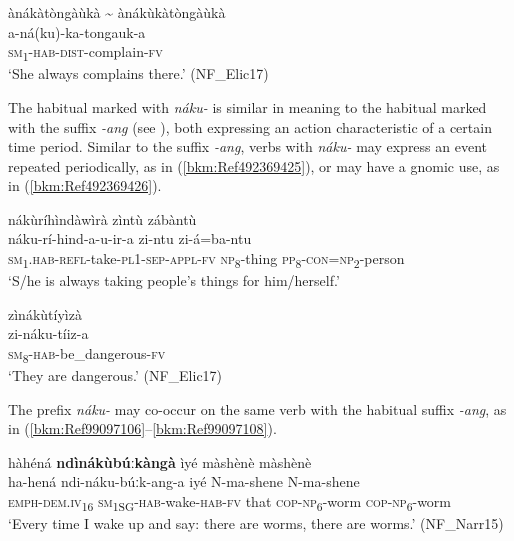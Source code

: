 \ea
\label{bkm:Ref492369367}
ànákàtòngàùkà {\textasciitilde} ànákùkàtòngàùkà\\
\gll a-ná(ku)-ka-tongauk-a\\
\textsc{sm}\textsubscript{1}-\textsc{hab}-\textsc{dist}-complain-\textsc{fv}\\
\glt ‘She always complains there.’ (NF\_Elic17)
\z

The habitual marked with \textit{náku-} is similar in meaning to the habitual marked with the suffix \textit{-ang} (see ), both expressing an action characteristic of a certain time period. Similar to the suffix \textit{-ang}, verbs with \textit{náku-} may express an event repeated periodically, as in (\ref{bkm:Ref492369425}), or may have a gnomic use, as in (\ref{bkm:Ref492369426}).

\ea
\label{bkm:Ref492369425}
nákùríhìndàwìrà zìntù zábàntù\\
\gll náku-rí-hind-a-u-ir-a      zi-ntu    zi-á=ba-ntu\\
\textsc{sm}\textsubscript{1}.\textsc{hab}-\textsc{refl}-take-\textsc{pl}1-\textsc{sep}-\textsc{appl}-\textsc{fv}  \textsc{np}\textsubscript{8}-thing  \textsc{pp}\textsubscript{8}-\textsc{con}=\textsc{np}\textsubscript{2}-person\\
\glt ‘S/he is always taking people’s things for him/herself.’
\z

\ea
\label{bkm:Ref492369426}
\glll zìnákùtíyìzà \\
zi-náku-tíiz-a\\
\textsc{sm}\textsubscript{8}-\textsc{hab}-be\_dangerous-\textsc{fv}\\
\glt ‘They are dangerous.’ (NF\_Elic17)
\z

The prefix \textit{náku-} may co-occur on the same verb with the habitual suffix \textit{-ang}, as in (\ref{bkm:Ref99097106}--\ref{bkm:Ref99097108}).

\ea
\label{bkm:Ref99097106}
hàhéná \textbf{ndìnákùbúːkàngà} ìyé màshènè màshènè\\
\gll ha-hená    ndi-náku-búːk-ang-a iyé  N-ma-shene    N-ma-shene \\
\textsc{emph}-\textsc{dem}.\textsc{iv}\textsubscript{16}  \textsc{sm}\textsubscript{1SG}-\textsc{hab}-wake-\textsc{hab}-\textsc{fv}
that  \textsc{cop}-\textsc{np}\textsubscript{6}\--worm  \textsc{cop}-\textsc{np}\textsubscript{6}-worm\\
\glt ‘Every time I wake up and say: there are worms, there are worms.’ (NF\_Narr15)
\z

